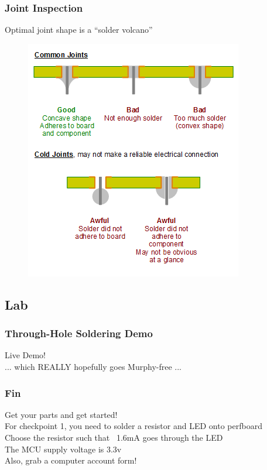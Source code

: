 \documentclass{beamer}
\begin{document}
\begin{frame}
\frametitle{Joint Inspection}
Optimal joint shape is a ``solder volcano''
\begin{figure}
\centering
\includegraphics[width=\textwidth,height=0.8\textheight,keepaspectratio]{images-dis1/solder-joints}
\end{figure}
\end{frame}

\subsection{Lab}
\begin{frame}
\frametitle{Through-Hole Soldering Demo}
\begin{center}
{\huge Live Demo!} \\
\vspace{5mm}
{\tiny... which REALLY hopefully goes Murphy-free ...}
\end{center}
\end{frame}

\begin{frame}
\frametitle{Fin}
\begin{center}
Get your parts and get started! \\
\vspace{20px}
For checkpoint 1, you need to solder a resistor and LED onto perfboard \\
Choose the resistor such that ~1.6mA goes through the LED \\
The MCU supply voltage is 3.3v \\
\vspace{20px}
Also, grab a computer account form!
\end{center}
\end{frame}
\end{document}
